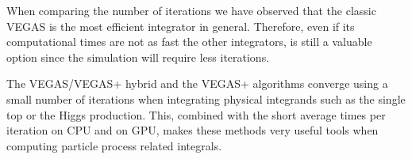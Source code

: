 \documentclass[../main/main.tex]{subfiles}
\begin{document}
When comparing the number of iterations we have observed that the classic VEGAS is the most efficient integrator in general. Therefore, even if its computational times are not as fast the other integrators, is still a valuable option since the simulation will require less iterations. 

The VEGAS/VEGAS+ hybrid and the VEGAS+ algorithms converge using a small number of iterations when integrating physical integrands such as the single top or the Higgs production. This, combined with the short average times per iteration on CPU and on GPU, makes these methods very useful tools when computing particle process related integrals.



	
\end{document}

